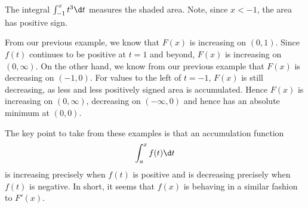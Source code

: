 \begin{marginfigure}
\caption{The integral $\int_{-1}^x t^3 \d t$ measures the shaded
  area. Note, since $x<-1$, the area has positive sign.}
\label{figure:accumulationegreal}
\end{marginfigure}

\begin{solution}
From our previous example, we know that $F(x)$ is increasing on
$(0,1)$. Since $f(t)$ continues to be positive at $t=1$ and beyond,
  $F(x)$ is increasing on $(0,\infty)$. On the other hand, we know
  from our previous example that $F(x)$ is decreasing on $(-1,0)$. For
  values to the left of $t=-1$, $F(x)$ is still decreasing, as less
  and less positively signed area is accumulated. Hence $F(x)$ is
  increasing on $(0,\infty)$, decreasing on $(-\infty,0)$ and hence
  has an absolute minimum at $(0,0)$.
\end{solution}

The key point to take from these examples is that an accumulation function
\[
\int_a^x f(t) \d t
\]
is increasing precisely when $f(t)$ is positive and is decreasing
precisely when $f(t)$ is negative. In short, it seems that $f(x)$ is
behaving in a similar fashion to $F'(x)$.




